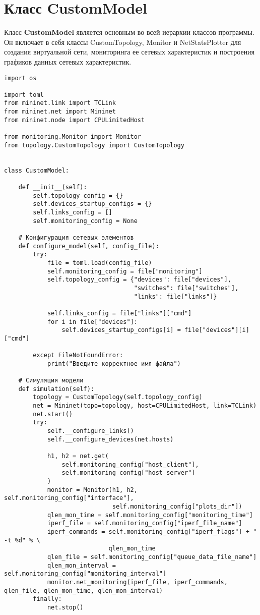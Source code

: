 \chapter{Класс CustomModel}

Класс \textbf{CustomModel} является основным во всей иерархии классов
программы. Он включает в себя классы CustomTopology, Monitor и
NetStatsPlotter для создания виртуальной сети, мониторинга ее сетевых
характеристик и построения графиков данных сетевых характеристик.

\begin{verbatim}
import os

import toml
from mininet.link import TCLink
from mininet.net import Mininet
from mininet.node import CPULimitedHost

from monitoring.Monitor import Monitor
from topology.CustomTopology import CustomTopology


class CustomModel:

    def __init__(self):
        self.topology_config = {}
        self.devices_startup_configs = {}
        self.links_config = []
        self.monitoring_config = None

    # Конфигурация сетевых элементов
    def configure_model(self, config_file):
        try:
            file = toml.load(config_file)
            self.monitoring_config = file["monitoring"]
            self.topology_config = {"devices": file["devices"],
                                    "switches": file["switches"],
                                    "links": file["links"]}

            self.links_config = file["links"]["cmd"]
            for i in file["devices"]:
                self.devices_startup_configs[i] = file["devices"][i]["cmd"]

        except FileNotFoundError:
            print("Введите корректное имя файла")

    # Симуляция модели
    def simulation(self):
        topology = CustomTopology(self.topology_config)
        net = Mininet(topo=topology, host=CPULimitedHost, link=TCLink)
        net.start()
        try:
            self.__configure_links()
            self.__configure_devices(net.hosts)

            h1, h2 = net.get(
                self.monitoring_config["host_client"],
                self.monitoring_config["host_server"]
            )
            monitor = Monitor(h1, h2, self.monitoring_config["interface"],
                              self.monitoring_config["plots_dir"])
            qlen_mon_time = self.monitoring_config["monitoring_time"]
            iperf_file = self.monitoring_config["iperf_file_name"]
            iperf_commands = self.monitoring_config["iperf_flags"] + " -t %d" % \
                             qlen_mon_time
            qlen_file = self.monitoring_config["queue_data_file_name"]
            qlen_mon_interval = self.monitoring_config["monitoring_interval"]
            monitor.net_monitoring(iperf_file, iperf_commands, qlen_file, qlen_mon_time, qlen_mon_interval)
        finally:
            net.stop()


\end{verbatim}
